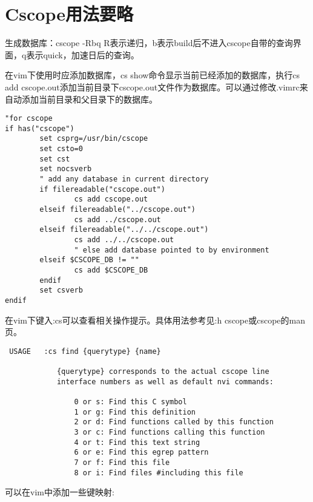 \section{Cscope用法要略}

生成数据库：cscope -Rbq 
R表示递归，b表示build后不进入cscope自带的查询界面，q表示quick，加速日后的查询。

在vim下使用时应添加数据库，cs show命令显示当前已经添加的数据库，执行cs add cscope.out添加当前目录下cscope.out文件作为数据库。可以通过修改.vimrc来自动添加当前目录和父目录下的数据库。

\begin{verbatim}
"for cscope
if has("cscope")
        set csprg=/usr/bin/cscope
        set csto=0
        set cst 
        set nocsverb
        " add any database in current directory
        if filereadable("cscope.out")
                cs add cscope.out
        elseif filereadable("../cscope.out")
                cs add ../cscope.out
        elseif filereadable("../../cscope.out")
                cs add ../../cscope.out
                " else add database pointed to by environment
        elseif $CSCOPE_DB != ""
                cs add $CSCOPE_DB
        endif
        set csverb
endif

\end{verbatim}

在vim下键入:cs可以查看相关操作提示。具体用法参考见:h cscope或cscope的man页。

\begin{verbatim}
 USAGE   :cs find {querytype} {name}

            {querytype} corresponds to the actual cscope line
            interface numbers as well as default nvi commands:

                0 or s: Find this C symbol
                1 or g: Find this definition
                2 or d: Find functions called by this function
                3 or c: Find functions calling this function
                4 or t: Find this text string
                6 or e: Find this egrep pattern
                7 or f: Find this file
                8 or i: Find files #including this file

\end{verbatim}

可以在vim中添加一些键映射:


